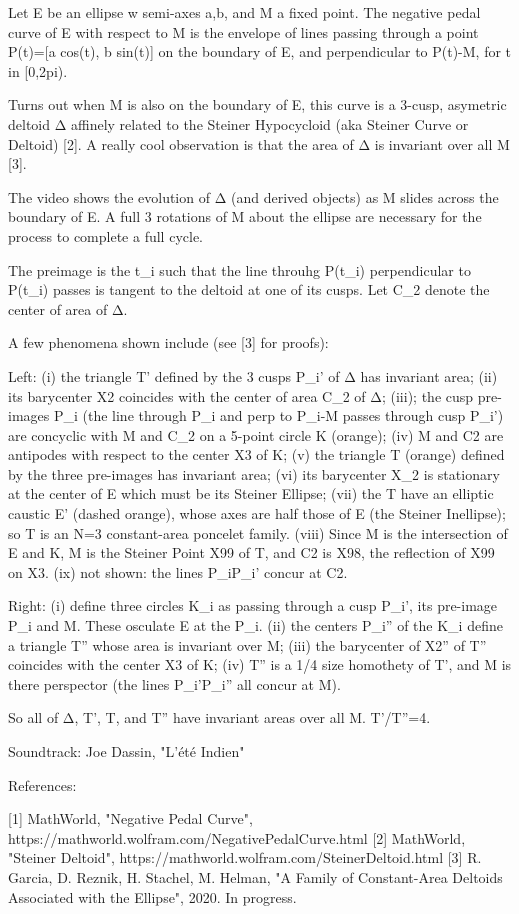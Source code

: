 Let E be an ellipse w semi-axes a,b, and M a fixed point. The negative pedal curve of E with respect to M is the envelope of lines passing through a point P(t)=[a cos(t), b sin(t)] on the boundary of E, and perpendicular to P(t)-M, for t in [0,2pi). 

Turns out when M is also on the boundary of E, this curve is a 3-cusp, asymetric deltoid Δ affinely related to the Steiner Hypocycloid (aka Steiner Curve or Deltoid) [2]. A really cool observation is that the area of Δ is invariant over all M [3].

The video shows the evolution of Δ (and derived objects) as M slides across the boundary of E.  A full 3 rotations of M about the ellipse are necessary for the process to complete a full cycle.

The preimage is the t_i such that the line throuhg P(t_i) perpendicular to P(t_i) passes is tangent to the deltoid at one of its cusps. Let C_2 denote the center of area of Δ. 

A few phenomena shown include (see [3] for proofs):

Left: (i) the triangle T' defined by the 3 cusps P_i' of Δ has invariant area; (ii) its barycenter X2 coincides with the center of area C_2 of Δ; (iii); the cusp pre-images P_i (the line through P_i and perp to P_i-M passes through cusp P_i') are concyclic with M and C_2 on a 5-point circle K (orange); (iv) M and C2 are antipodes with respect to the center X3 of K; (v) the triangle T (orange) defined by the three pre-images has invariant area; (vi) its barycenter X_2 is stationary at the center of E which must be its Steiner Ellipse; (vii) the T have an elliptic caustic E' (dashed orange), whose axes are half those of E (the Steiner Inellipse); so T is an N=3 constant-area poncelet family. (viii) Since M is the intersection of E and K, M is the Steiner Point X99 of T, and C2 is X98, the reflection of X99 on X3. (ix) not shown: the lines P_iP_i' concur at C2.

Right: (i) define three circles K_i as passing through a cusp P_i', its pre-image P_i and M. These osculate E at the P_i. (ii) the centers P_i'' of the K_i define a triangle T'' whose area is invariant over M; (iii) the barycenter of X2'' of T'' coincides with the center X3 of K; (iv) T'' is a 1/4 size homothety of T', and M is there perspector (the lines P_i'P_i'' all concur at M).

So all of Δ, T', T, and T'' have invariant areas over all M. T'/T''=4. 

Soundtrack: Joe Dassin, "L'été Indien"

References:

[1] MathWorld, "Negative Pedal Curve", https://mathworld.wolfram.com/NegativePedalCurve.html
[2] MathWorld, "Steiner Deltoid",  https://mathworld.wolfram.com/SteinerDeltoid.html
[3] R. Garcia, D. Reznik, H. Stachel, M. Helman, "A Family of Constant-Area Deltoids Associated with the Ellipse", 2020. In progress.